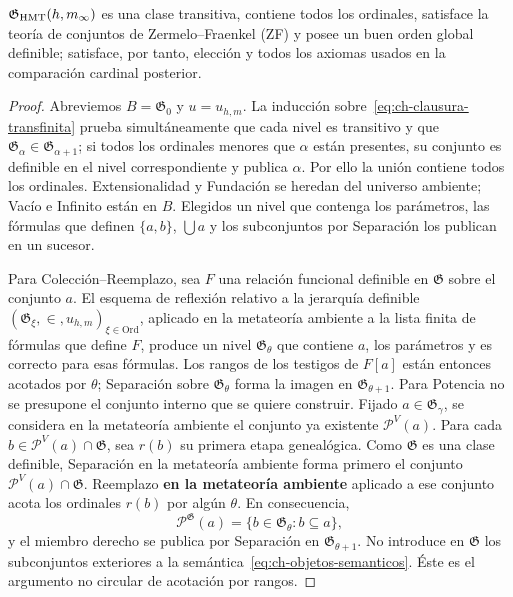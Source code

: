 \begin{lemma}
\label{thm:ch-6b}
\(\mathfrak G_{\rm HMT}(h,m_\infty)\) es una clase transitiva, contiene todos
los ordinales, satisface la teoría de conjuntos de Zermelo--Fraenkel (ZF) y
posee un buen orden global definible; satisface,
por tanto, elección y todos los axiomas usados en la comparación cardinal posterior.

\end{lemma}
\begin{proof}
Abreviemos \(B=\mathfrak G_0\) y \(u=u_{h,m}\). La inducción
sobre~\eqref{eq:ch-clausura-transfinita} prueba simultáneamente que cada nivel es transitivo y que
\(\mathfrak G_\alpha\in\mathfrak G_{\alpha+1}\); si todos los ordinales
menores que \(\alpha\) están presentes, su conjunto es definible en el nivel
correspondiente y publica \(\alpha\). Por ello la unión contiene todos los
ordinales. Extensionalidad y Fundación se heredan del universo ambiente;
Vacío e Infinito están en \(B\). Elegidos un nivel que contenga los parámetros,
las fórmulas que definen \(\{a,b\}\), \(\bigcup a\) y los subconjuntos por
Separación los publican en un sucesor.

Para Colección--Reemplazo, sea \(F\) una relación funcional definible en
\(\mathfrak G\) sobre el conjunto \(a\). El esquema de reflexión relativo a
la jerarquía definible \((\mathfrak G_\xi,\in,u_{h,m})_{\xi\in\mathrm{Ord}}\),
aplicado en la metateoría ambiente a la lista finita de fórmulas que define
\(F\), produce un nivel
\(\mathfrak G_\theta\) que contiene \(a\), los parámetros y es correcto para
esas fórmulas. Los rangos de los testigos de \(F[a]\) están entonces acotados
por \(\theta\); Separación sobre \(\mathfrak G_\theta\) forma la imagen en
\(\mathfrak G_{\theta+1}\). Para Potencia no se presupone el conjunto interno
que se quiere construir. Fijado \(a\in\mathfrak G_\gamma\), se considera en
la metateoría ambiente el conjunto ya existente \(\mathcal P^V(a)\). Para
cada \(b\in\mathcal P^V(a)\cap\mathfrak G\), sea \(r(b)\) su primera etapa
genealógica. Como \(\mathfrak G\) es una clase definible, Separación en la
metateoría ambiente forma primero el conjunto
\(\mathcal P^V(a)\cap\mathfrak G\). Reemplazo \textbf{en la metateoría ambiente}
aplicado a ese conjunto acota los ordinales \(r(b)\) por algún \(\theta\).
En consecuencia,
\[
 \mathcal P^{\mathfrak G}(a)
 =\{b\in\mathfrak G_\theta:b\subseteq a\},
\]
y el miembro derecho se publica por Separación en
\(\mathfrak G_{\theta+1}\). No introduce en \(\mathfrak G\) los subconjuntos
exteriores a la semántica~\eqref{eq:ch-objetos-semanticos}. Éste es el argumento no circular de
acotación por rangos.


\end{proof}
